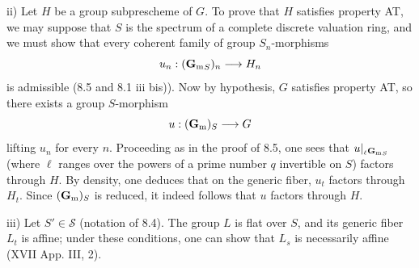ii) Let $H$ be a group subprescheme of $G$. To prove that $H$ satisfies property AT, we may suppose that $S$ is the spectrum of a complete discrete valuation ring, and we must show that every coherent family of group $S_n$-morphisms
\[
u_n:({\mathbf{G}_{\mathrm{m}}}_S)_n\longrightarrow H_n
\]
is admissible (8.5 and 8.1 iii bis)). Now by hypothesis, $G$ satisfies property AT, so there exists a group $S$-morphism
\[
u:(\mathbf{G}_{\mathrm{m}})_S\longrightarrow G
\]
lifting $u_n$ for every $n$. Proceeding as in the proof of 8.5, one sees that $u|_{{}_\ell{\mathbf{G}_{\mathrm{m}}}_S}$ (where $\ell$ ranges over the powers of a prime number $q$ invertible on $S$) factors through $H$. By density, one deduces that on the generic fiber, $u_t$ factors through $H_t$. Since $(\mathbf{G}_{\mathrm{m}})_S$ is reduced, it indeed follows that $u$ factors through $H$.

iii) Let $S'\in\mathscr S$ (notation of 8.4). The group $L$ is flat over $S$, and its generic fiber $L_t$ is affine; under these conditions, one can show that $L_s$ is necessarily affine (XVII App. III, 2).

